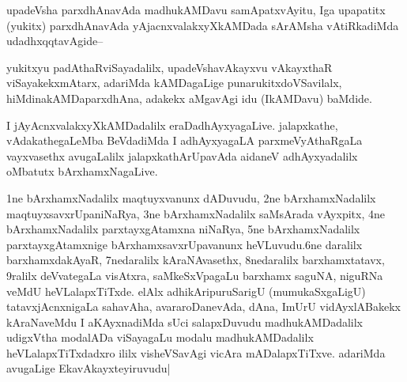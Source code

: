 \begin{center}


\end{center}

\begin{artha}
upadeVsha parxdhAnavAda madhukAMDavu samApatxvAyitu, Iga upapatitx (yukitx) parxdhAnavAda 
yAjacnxvalakxyXkAMDada sArAMsha vAtiRkadiMda udadhxqqtavAgide--

yukitxyu padAthaRviSayadalilx, upadeVshavAkayxvu vAkayxthaR viSayakekxmAtarx, adariMda 
kAMDagaLige punarukitxdoVSavilalx, hiMdinakAMDaparxdhAna, adakekx aMgavAgi idu 
(IkAMDavu) baMdide.  
\end{artha}

\begin{center}
\end{center}

\begin{center}
I jAyAcnxvalakxyXkAMDadalilx eraDadhAyxyagaLive. jalapxkathe, vAdakathegaLeMba BeVdadiMda 
I adhAyxyagaLA parxmeVyAthaRgaLa vayxvasethx avugaLalilx jalapxkathArUpavAda aidaneV 
adhAyxyadalilx oMbatutx bArxhamxNagaLive.
\end{center}

\begin{center}
\end{center}

\begin{artha}
1ne bArxhamxNadalilx maqtuyxvanunx dADuvudu, 2ne bArxhamxNadalilx maqtuyxsavxrUpaniNaRya, 3ne bArxhamxNadalilx saMsArada vAyxpitx, 4ne bArxhamxNadalilx parxtayxgAtamxna niNaRya, 5ne bArxhamxNadalilx parxtayxgAtamxnige bArxhamxsavxrUpavanunx heVLuvudu.6ne daralilx barxhamxdakAyaR, 7nedaralilx kAraNAvasethx, 8nedaralilx barxhamxtatavx, 9ralilx deVvategaLa visAtxra, saMkeSxVpagaLu barxhamx saguNA, niguRNa veMdU heVLalapxTiTxde. elAlx adhikAripuruSarigU (mumukaSxgaLigU) tatavxjAcnxnigaLa sahavAha, avararoDanevAda, dAna, ImUrU vidAyxlABakekx kAraNaveMdu I aKAyxnadiMda sUci salapxDuvudu madhukAMDadalilx udigxVtha modalADa viSayagaLu modalu madhukAMDadalilx heVLalapxTiTxdadxro ililx visheVSavAgi vicAra mADalapxTiTxve. adariMda avugaLige EkavAkayxteyiruvudu|
\end{artha}

